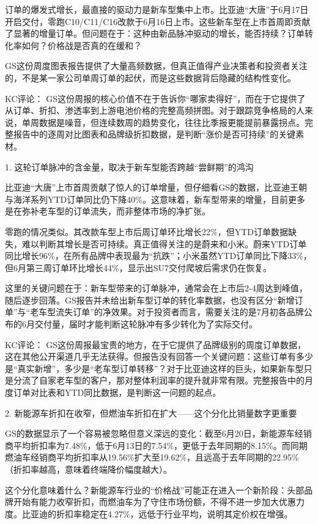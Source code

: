 \documentclass[11pt]{ctexart}
\begin{document}
订单的爆发式增长，最直接的驱动力是新车型集中上市。比亚迪“大唐”于6月17日开启交付，零跑C10/C11/C16改款于6月16日上市。这些新车型在上市首周即贡献了显著的增量订单。但问题在于：这种由新品脉冲驱动的增长，能否持续？订单转化率如何？价格战是否真的在缓和？

GS这份周度图表报告提供了大量高频数据，但真正值得产业决策者和投资者关注的，不是某一家公司单周订单的起伏，而是这些数据背后隐藏的结构性变化。

KC评论： GS这份周报的核心价值不在于告诉你“哪家卖得好”，而在于它提供了从订单、折扣、渗透率到上游电池价格的完整高频拼图。对于跟踪竞争格局的人来说，单周数据是噪音，但连续数周的趋势变化，往往比季报更能提前暴露拐点。完整报告中的逐周对比图表和品牌级折扣数据，是判断“涨价是否可持续”的关键素材。

1. 这轮订单脉冲的含金量，取决于新车型能否跨越“尝鲜期”的鸿沟

比亚迪“大唐”上市首周贡献了惊人的订单增量，但仔细看GS的数据，比亚迪王朝与海洋系列YTD订单同比仍下降40\%。这意味着，新车型带来的增量，目前更多是在弥补老车型的订单流失，而非整体市场的净扩张。

零跑的情况类似。其改款车型上市后周订单环比增长22\%，但YTD订单数据缺失，难以判断其增长是否可持续。真正值得关注的是蔚来和小米。蔚来YTD订单同比增长96\%，在所有品牌中表现最为“抗跌”；小米虽然YTD订单同比下降33\%，但6月第三周订单环比增长44\%，显示出SU7交付爬坡后需求仍在恢复。

这里的关键问题在于：新车型带来的订单脉冲，通常会在上市后2-4周达到峰值，随后逐步回落。GS报告并未给出新车型订单的转化率数据，也没有区分“新增订单”与“老车型流失订单”的净效果。对于投资者而言，需要关注的是7月初各品牌公布的6月交付量，届时才能判断这轮脉冲有多少转化为了实际交付。

KC评论： GS这份周报最宝贵的地方，在于它提供了品牌级别的周度订单数据，这在其他公开渠道几乎无法获得。但报告没有回答一个关键问题：这些订单有多少是“真实新增”，多少是“老车型订单转移”？对于比亚迪这样的巨头，如果新车型只是分流了自家老车型的客户，那对整体利润率的提升就非常有限。完整报告中的月度订单对比表和YTD同比数据，是判断这一问题的起点。

2. 新能源车折扣在收窄，但燃油车折扣在扩大——这个分化比销量数字更重要

GS的数据显示了一个容易被忽略但意义深远的变化：截至6月20日，新能源车经销商平均折扣率为7.48\%，低于6月13日的7.54\%，更低于去年同期的8.15\%。而同期燃油车经销商平均折扣率从19.56\%扩大至19.62\%，且远高于去年同期的22.95\%（折扣率越高，意味着终端降价幅度越大）。

这个分化意味着什么？新能源车行业的“价格战”可能正在进入一个新阶段：头部品牌开始有能力收窄折扣，而燃油车为了守住市场份额，不得不进一步加大优惠力度。比亚迪的折扣率稳定在4.27\%，远低于行业平均，说明其定价权在增强。
\end{document}
